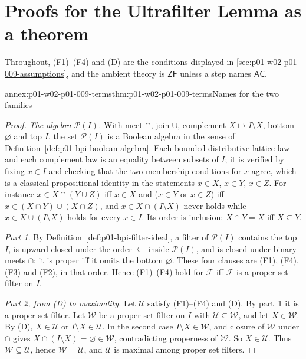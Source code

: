 \section{Proofs for the Ultrafilter Lemma as a theorem}
\label{sec:annex-p01-w02-p01-009-ultrafilter-lemma}

Throughout, (F1)--(F4) and (D) are the conditions displayed in
\cref{sec:p01-w02-p01-009-assumptions}, and the ambient theory is
\(\mathsf{ZF}\) unless a step names \(\mathsf{AC}\).

\begin{annexitem}{annex:p01-w02-p01-009-terms}{thm:p01-w02-p01-009-terms}{Names for the two families}
\begin{proof}
\emph{The algebra \(\mathcal P(I)\).} With meet \(\cap\), join \(\cup\),
complement \(X\mapsto I\setminus X\), bottom \(\varnothing\) and top \(I\),
the set \(\mathcal P(I)\) is a Boolean algebra in the sense of
Definition~\ref{def:p01-bpi-boolean-algebra}. Each bounded distributive
lattice law and each complement law is an equality between subsets of \(I\);
it is verified by fixing \(x\in I\) and checking that the two membership
conditions for \(x\) agree, which is a classical propositional identity in
the statements \(x\in X\), \(x\in Y\), \(x\in Z\). For instance
\(x\in X\cap(Y\cup Z)\) iff \(x\in X\) and (\(x\in Y\) or \(x\in Z\)) iff
\(x\in(X\cap Y)\cup(X\cap Z)\), and \(x\in X\cap(I\setminus X)\) never holds
while \(x\in X\cup(I\setminus X)\) holds for every \(x\in I\). Its order is
inclusion: \(X\cap Y=X\) iff \(X\subseteq Y\).

\emph{Part 1.} By Definition~\ref{def:p01-bpi-filter-ideal}, a filter of
\(\mathcal P(I)\) contains the top \(I\), is upward closed under the order
\(\subseteq\) inside \(\mathcal P(I)\), and is closed under binary meets
\(\cap\); it is proper iff it omits the bottom \(\varnothing\). These four
clauses are (F1), (F4), (F3) and (F2), in that order. Hence (F1)--(F4) hold
for \(\mathcal F\) iff \(\mathcal F\) is a proper set filter on \(I\).

\emph{Part 2, from (D) to maximality.} Let \(\mathcal U\) satisfy
(F1)--(F4) and (D). By part~1 it is a proper set filter. Let \(\mathcal W\)
be a proper set filter on \(I\) with \(\mathcal U\subseteq\mathcal W\), and
let \(X\in\mathcal W\). By (D), \(X\in\mathcal U\) or
\(I\setminus X\in\mathcal U\). In the second case
\(I\setminus X\in\mathcal W\), and closure of \(\mathcal W\) under \(\cap\)
gives \(X\cap(I\setminus X)=\varnothing\in\mathcal W\), contradicting
properness of \(\mathcal W\). So \(X\in\mathcal U\). Thus
\(\mathcal W\subseteq\mathcal U\), hence \(\mathcal W=\mathcal U\), and
\(\mathcal U\) is maximal among proper set filters.


\end{proof}
\end{annexitem}
